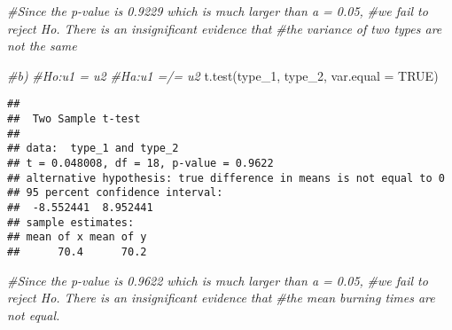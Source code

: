 \documentclass[
]{article}
\newenvironment{Shaded}{\begin{snugshade}}{\end{snugshade}}
\newcommand{\AttributeTok}[1]{\textcolor[rgb]{0.77,0.63,0.00}{#1}}
\newcommand{\CommentTok}[1]{\textcolor[rgb]{0.56,0.35,0.01}{\textit{#1}}}
\newcommand{\ConstantTok}[1]{\textcolor[rgb]{0.00,0.00,0.00}{#1}}
\newcommand{\FunctionTok}[1]{\textcolor[rgb]{0.00,0.00,0.00}{#1}}
\newcommand{\NormalTok}[1]{#1}
\begin{document}
\begin{Shaded}
\begin{Highlighting}[]
\CommentTok{\#Since the p{-}value is 0.9229 which is much larger than a = 0.05,}
\CommentTok{\#we fail to reject Ho. There is an insignificant evidence that }
\CommentTok{\#the variance of two types are not the same}

\CommentTok{\#b)}
\CommentTok{\#Ho:u1 = u2}
\CommentTok{\#Ha:u1 =/= u2}
\FunctionTok{t.test}\NormalTok{(type\_1, type\_2, }\AttributeTok{var.equal =} \ConstantTok{TRUE}\NormalTok{)}
\end{Highlighting}
\end{Shaded}

\begin{verbatim}
## 
##  Two Sample t-test
## 
## data:  type_1 and type_2
## t = 0.048008, df = 18, p-value = 0.9622
## alternative hypothesis: true difference in means is not equal to 0
## 95 percent confidence interval:
##  -8.552441  8.952441
## sample estimates:
## mean of x mean of y 
##      70.4      70.2
\end{verbatim}

\begin{Shaded}
\begin{Highlighting}[]
\CommentTok{\#Since the p{-}value is 0.9622 which is much larger than a = 0.05,}
\CommentTok{\#we fail to reject Ho. There is an insignificant evidence that }
\CommentTok{\#the mean burning times are not equal.}
\end{Highlighting}
\end{Shaded}
\end{document}
